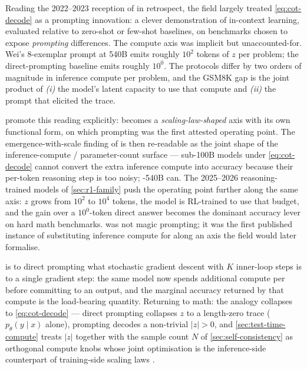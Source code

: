 Reading the 2022--2023 reception of  in retrospect, the field largely
treated \cref{eq:cot-decode} as a prompting innovation: a clever
demonstration of in-context learning, evaluated relative to
zero-shot or few-shot baselines, on benchmarks chosen to expose
\emph{prompting} differences. The compute axis was implicit but
unaccounted-for. Wei's 8-exemplar  prompt at 540B emits roughly
$10^2$ tokens of $z$ per problem; the direct-prompting baseline emits
roughly $10^0$. The protocols differ by two orders of magnitude in
inference compute per problem, and the GSM8K gap is the joint product
of \emph{(i)} the model's latent capacity to use that compute and
\emph{(ii)} the prompt that elicited the trace.

\citet{snell2024} promote this reading explicitly: 
becomes a \emph{scaling-law-shaped} axis with its own functional form,
on which  prompting was the first attested operating point. The
emergence-with-scale finding of
\citet[\S 3.3]{wei2022-cot} is then re-readable as the joint shape of
the inference-compute / parameter-count surface — sub-100B models
under \cref{eq:cot-decode} cannot convert the extra inference compute
into accuracy because their per-token reasoning step is too noisy;
-540B can. The 2025--2026 reasoning-trained models of
\cref{sec:r1-family} push the operating point further along the same
axis: $z$ grows from $10^2$ to $10^4$ tokens, the model is RL-trained
to use that budget, and the gain over a $10^0$-token direct answer
becomes the dominant accuracy lever on hard math benchmarks.  was
not magic prompting; it was the first published instance of substituting
inference compute for  along an axis the field would later
formalise.

\begin{analogy}
 is to direct prompting what stochastic gradient descent with $K$
inner-loop steps is to a single gradient step: the same model now
spends additional compute per  before committing to an output,
and the marginal accuracy returned by that compute is the load-bearing
quantity. Returning to math: the analogy collapses to
\cref{eq:cot-decode} — direct prompting collapses $z$ to a length-zero
trace ($p_\theta(y \mid x)$ alone),  prompting decodes a non-trivial
$|z| > 0$, and \cref{sec:test-time-compute} treats $|z|$ together with
the sample count $N$ of \cref{sec:self-consistency} as orthogonal
compute knobs whose joint optimisation is the inference-side
counterpart of training-side scaling laws \citep[\S 1]{snell2024}.
\end{analogy}

